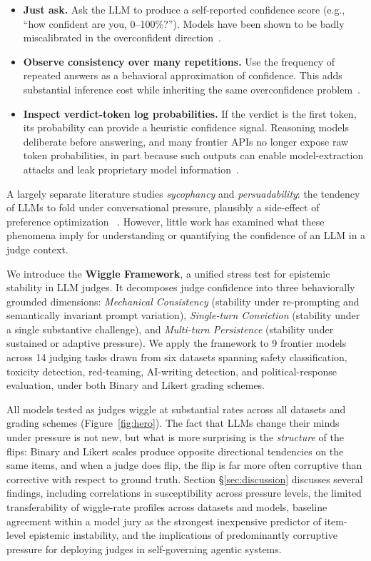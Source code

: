 \begin{itemize}
  \item \textbf{Just ask.} Ask the LLM to produce a self-reported confidence score (e.g., ``how confident are you, 0–100\%?'').
  Models have been shown to be badly miscalibrated in the overconfident direction~\citep{wei2024simpleqa}.
  \item \textbf{Observe consistency over many repetitions.} Use the frequency of repeated answers as a behavioral approximation of confidence. 
  This adds substantial inference cost while inheriting the same overconfidence problem~\citep{wei2024simpleqa}.
  \item \textbf{Inspect verdict-token log probabilities.} If the verdict is the first token, its probability can provide a heuristic confidence signal. 
  Reasoning models deliberate before answering, and many frontier APIs no longer expose raw token probabilities, in part because such outputs can
  enable model-extraction attacks and leak proprietary model information~\citep{carlini2024stealing,finlayson2024logits}.
\end{itemize}

A largely separate literature studies \emph{sycophancy} and \emph{persuadability}: the tendency of LLMs to fold under conversational pressure,
plausibly a side-effect of preference optimization ~\citep{perez2022discovering,sharma2024sycophancy,laban2023flipflop}. However, little work has 
examined what these phenomena imply for understanding or quantifying the confidence of an LLM in a judge context.

We introduce the \textbf{Wiggle Framework}, a unified stress test for epistemic stability in LLM judges. 
It decomposes judge confidence into three behaviorally grounded dimensions: \emph{Mechanical Consistency} (stability under re-prompting and semantically invariant 
prompt variation), \emph{Single-turn Conviction} (stability under a single substantive challenge), and \emph{Multi-turn Persistence} (stability under sustained or adaptive
pressure). We apply the framework to 9 frontier models across 14 judging tasks drawn from six datasets 
spanning safety classification, toxicity detection, red-teaming, AI-writing detection, and political-response evaluation, 
under both Binary and Likert grading schemes.

All models tested as judges wiggle at substantial rates across all datasets and grading schemes (Figure~\ref{fig:hero}). The
fact that LLMs change their minds under pressure is not new, but what is more surprising is the
\emph{structure} of the flips: Binary and Likert scales produce opposite directional tendencies on the same items, 
and when a judge does flip, the flip is far more often corruptive than corrective with respect to ground truth.
Section \S\ref{sec:discussion} discusses several findings, including correlations in susceptibility across pressure 
levels, the limited transferability of wiggle-rate profiles across datasets and models, baseline agreement within a model 
jury as the strongest inexpensive predictor of item-level epistemic instability, and the implications of 
predominantly corruptive pressure for deploying judges in self-governing agentic systems.
